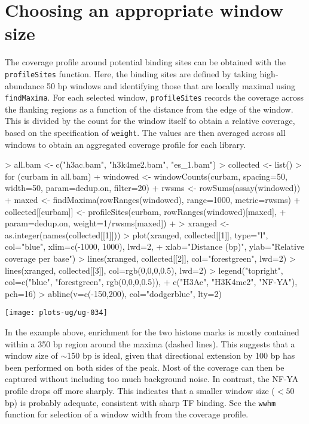 \documentclass[12pt]{report}
\renewenvironment{Schunk}{\vspace{0pt}}{\vspace{0pt}}
\newcommand{\code}[1]{{\small\texttt{#1}}}
\begin{document}
\section{Choosing an appropriate window size}
The coverage profile around potential binding sites can be obtained with the \code{profileSites} function.
Here, the binding sites are defined by taking high-abundance 50 bp windows and identifying those that are locally maximal using \code{findMaxima}.
For each selected window, \code{profileSites} records the coverage across the flanking regions as a function of the distance from the edge of the window.
This is divided by the count for the window itself to obtain a relative coverage, based on the specification of \code{weight}.
The values are then averaged across all windows to obtain an aggregated coverage profile for each library.

\begin{Schunk}
\begin{Sinput}
> all.bam <- c("h3ac.bam", "h3k4me2.bam", "es_1.bam")
> collected <- list()
> for (curbam in all.bam) {
+     windowed <- windowCounts(curbam, spacing=50, width=50, param=dedup.on, filter=20)
+     rwsms <- rowSums(assay(windowed))
+     maxed <- findMaxima(rowRanges(windowed), range=1000, metric=rwsms)
+     collected[[curbam]] <- profileSites(curbam, rowRanges(windowed)[maxed], 
+         param=dedup.on, weight=1/rwsms[maxed])
+ }
> xranged <- as.integer(names(collected[[1]]))
> plot(xranged, collected[[1]], type="l", col="blue", xlim=c(-1000, 1000), lwd=2, 
+     xlab="Distance (bp)", ylab="Relative coverage per base")
> lines(xranged, collected[[2]], col="forestgreen", lwd=2)
> lines(xranged, collected[[3]], col=rgb(0,0,0,0.5), lwd=2)
> legend("topright", col=c("blue", "forestgreen", rgb(0,0,0,0.5)),
+     c("H3Ac", "H3K4me2", "NF-YA"), pch=16)
> abline(v=c(-150,200), col="dodgerblue", lty=2)
\end{Sinput}
\end{Schunk}

\begin{center}
\texttt{[image: plots-ug/ug-034]}
\end{center}

In the example above, enrichment for the two histone marks is mostly contained within a 350 bp region around the maxima (dashed lines).
This suggests that a window size of $\sim$150 bp is ideal, given that directional extension by 100 bp has been performed on both sides of the peak.
Most of the coverage can then be captured without including too much background noise.
In contrast, the NF-YA profile drops off more sharply.
This indicates that a smaller window size ($< 50$ bp) is probably adequate, consistent with sharp TF binding.
See the \code{wwhm} function for selection of a window width from the coverage profile.
\end{document}
